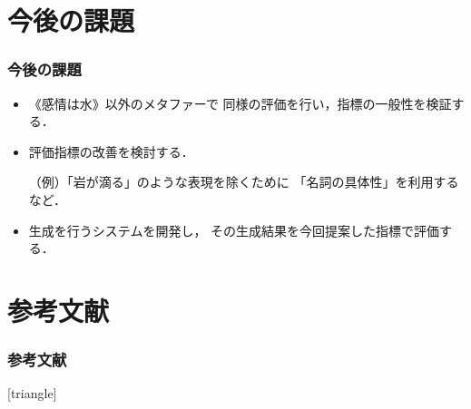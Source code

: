 \documentclass[12pt,usepdftitle=false]{beamer}
\begin{document}
\section{今後の課題}
\begin{frame}
    \frametitle{今後の課題}
    \addtolength{\leftmargini}{-1\zw}
    \begin{itemize}
		\item 《感情は水》以外のメタファーで
            同様の評価を行い，指標の一般性を検証する．

        \item 評価指標の改善を検討する．

            （例）「岩が滴る」のような表現を除くために
            「名詞の具体性」を利用するなど．

        \item 生成を行うシステムを開発し，
            その生成結果を今回提案した指標で評価する．
    \end{itemize}
\end{frame}

\section{参考文献}
\begin{frame}
\frametitle{参考文献}
\begingroup
\footnotesize
    [triangle]
    
    
\endgroup
\end{frame}
\end{document}
